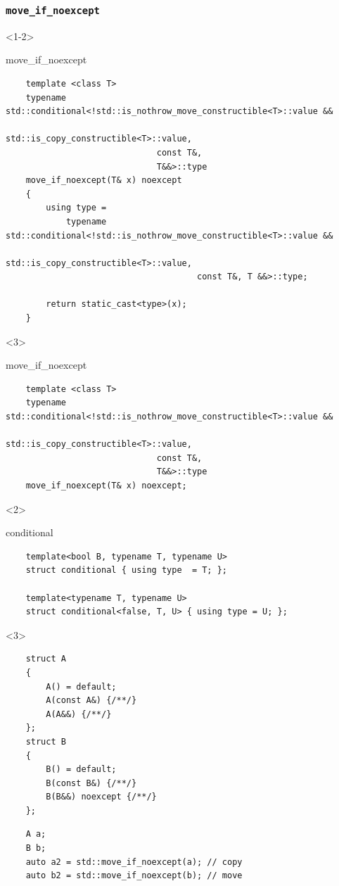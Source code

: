 \documentclass{beamer}
\begin{document}
\begin{frame}[fragile,t]
\frametitle{\texttt{move\_if\_noexcept}}
    \begin{onlyenv}<1-2>
    \begin{block}{move\_if\_noexcept}
    \begin{lstlisting}
    template <class T>
    typename std::conditional<!std::is_nothrow_move_constructible<T>::value &&
                                  std::is_copy_constructible<T>::value,
                              const T&,
                              T&&>::type
    move_if_noexcept(T& x) noexcept
    {
        using type =
            typename std::conditional<!std::is_nothrow_move_constructible<T>::value &&
                                          std::is_copy_constructible<T>::value,
                                      const T&, T &&>::type;

        return static_cast<type>(x);
    }
    \end{lstlisting}
    \end{block}
    \end{onlyenv}

    \begin{onlyenv}<3>
    \begin{block}{move\_if\_noexcept}
    \begin{lstlisting}
    template <class T>
    typename std::conditional<!std::is_nothrow_move_constructible<T>::value &&
                                  std::is_copy_constructible<T>::value,
                              const T&,
                              T&&>::type
    move_if_noexcept(T& x) noexcept;
    \end{lstlisting}
    \end{block}
    \end{onlyenv}
    
    \begin{onlyenv}<2>
    \begin{block}{conditional}
    \begin{lstlisting}
    template<bool B, typename T, typename U>
    struct conditional { using type  = T; };
    
    template<typename T, typename U>
    struct conditional<false, T, U> { using type = U; };
    \end{lstlisting}
    \end{block}
    \end{onlyenv}

    \begin{onlyenv}<3>
    \begin{lstlisting}
    struct A
    {
        A() = default;
        A(const A&) {/**/}
        A(A&&) {/**/}
    };
    struct B
    {
        B() = default;
        B(const B&) {/**/}
        B(B&&) noexcept {/**/}
    };
    \end{lstlisting}
    \hrulefill
    \begin{lstlisting}
    A a;
    B b;
    auto a2 = std::move_if_noexcept(a); // copy
    auto b2 = std::move_if_noexcept(b); // move
    \end{lstlisting}
    \end{onlyenv}
\end{frame}
\end{document}

